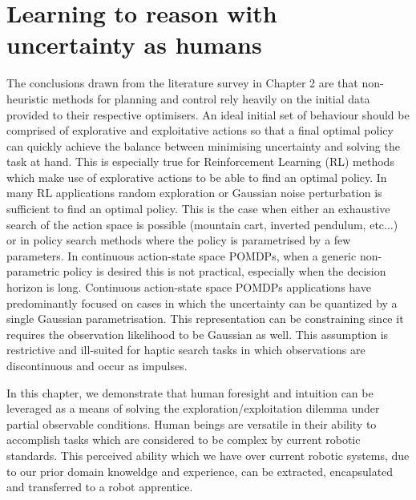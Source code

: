 \chapter{Learning to reason with uncertainty as humans}
%
%
%
The conclusions drawn from the literature survey in Chapter 2 are that non-heuristic methods for planning and control 
rely heavily on the initial data provided to their respective optimisers. An ideal initial set of behaviour should be comprised
of explorative and exploitative actions so that a final optimal policy can quickly achieve the balance between minimising 
uncertainty and solving the task at hand. This is especially true for Reinforcement Learning (RL) methods which make use of 
explorative actions to be able to find an optimal policy. In many RL applications random exploration or Gaussian noise perturbation
is sufficient to find an optimal policy. This is the case when either an exhaustive search of the action space is possible 
(mountain cart, inverted pendulum, etc...) or in policy search methods where the policy is parametrised by a few parameters.
In continuous action-state space POMDPs, when a generic non-parametric policy is desired  this is not practical, especially 
when the decision horizon is long. Continuous action-state space POMDPs applications have predominantly focused on cases in which 
the uncertainty can be quantized by a single Gaussian parametrisation. This representation can be constraining since it requires 
the observation likelihood to be Gaussian as well. This assumption is restrictive and ill-suited for haptic search tasks in 
which observations are discontinuous and occur as impulses. 

In this chapter, we demonstrate that human foresight and intuition can be leveraged as a means of solving the 
exploration/exploitation dilemma under partial observable conditions. Human beings are versatile in their ability to 
accomplish tasks which are considered to be complex by current robotic standards. This perceived ability which we have over 
current robotic systems, due to our prior domain knoweldge and experience, can be extracted, encapsulated and transferred 
to a robot apprentice.

